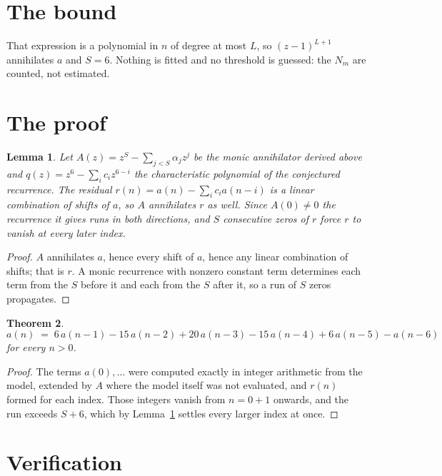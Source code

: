 \documentclass[11pt,a4paper]{article}
\theoremstyle{plain}
\newtheorem{theorem}{Theorem}
\newtheorem{lemma}[theorem]{Lemma}
\theoremstyle{definition}
\begin{document}
\section{The bound}

That expression is a polynomial in $n$ of degree at most $L$, so $(z-1)^{L+1}$ annihilates
$a$ and $S=6$. Nothing is fitted and no threshold is guessed: the $N_m$ are counted, not
estimated.

\section{The proof}

\begin{lemma}\label{lem:crit}
Let $A(z)=z^S-\sum_{j<S}\alpha_jz^{j}$ be the monic annihilator derived above and
$q(z)=z^{6}-\sum_ic_iz^{6-i}$ the characteristic polynomial of the conjectured
recurrence. The residual $r(n)=a(n)-\sum_ic_ia(n-i)$ is a linear combination of shifts of $a$,
so $A$ annihilates $r$ as well. Since $A(0)\ne0$ the recurrence it gives runs in both
directions, and $S$ consecutive zeros of $r$ force $r$ to vanish at every later index.
\end{lemma}

\begin{proof}
$A$ annihilates $a$, hence every shift of $a$, hence any linear combination of shifts; that is
$r$. A monic recurrence with nonzero constant term determines each term from the $S$ before it
and each from the $S$ after it, so a run of $S$ zeros propagates.
\end{proof}

\begin{theorem}
\[
a(n)\;=\;6\,a(n-1) - 15\,a(n-2) + 20\,a(n-3) - 15\,a(n-4) + 6\,a(n-5) - a(n-6)
\]
for every $n>0$.
\end{theorem}

\begin{proof}
The terms $a(0),\dots$ were computed exactly in integer arithmetic from the model, extended by
$A$ where the model itself was not evaluated, and $r(n)$ formed for each index. Those integers
vanish from $n=0+1$ onwards, and the run exceeds $S+6$, which by
Lemma~\ref{lem:crit} settles every larger index at once.
\end{proof}

\section{Verification}
\end{document}
